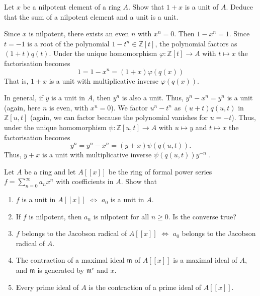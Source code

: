 \documentclass[12 pt, letterpaper]{hmcpset}
\begin{document}
\begin{problem}[A \& M Ch. 1 \#1.]
	Let $x$ be a nilpotent element of a ring $A$. Show that $1 + x$ is a unit of $A$. Deduce that the sum of a nilpotent element and a unit is a unit.
\end{problem}

\begin{solution}
	Since $x$ is nilpotent, there exists an even $n$ with $x^{n} = 0$. Then $1 - x^{n} = 1$. Since $t = - 1$ is a root of the polynomial $1 - t^{n} \in \mathbb{Z}[t]$, the polynomial factors as $(1 + t)q(t)$. Under the unique homomorphism $\varphi : \mathbb{Z}[t] \to A$ with $t \mapsto x$ the factorisation becomes
	\[
		1 = 1 - x^{n} = (1 + x)\varphi(q(x))
	\]
	That is, $1 + x$ is a unit with multiplicative inverse $\varphi(q(x))$.

	In general, if $y$ is a unit in $A$, then $y^{n}$ is also a unit. Thus, $y^{n} - x^{n} = y^{n}$ is a unit (again, here $n$ is even, with $x^{n} = 0$). We factor $u^{n} - t^{n}$ as $(u + t) q(u, t)$ in $\mathbb{Z}[u, t]$ (again, we can factor because the polynomial vanishes for $u = - t$). Thus, under the unique homomorphism $\psi : \mathbb{Z}[u, t] \to A$ with $u \mapsto y$ and $t \mapsto x$ the factorisation becomes
	\[
		y^{n} = y^{n} - x^{n} = (y + x) \psi(q(u, t)).
	\]
	Thus, $y + x$ is a unit with multiplicative inverse $\psi(q(u, t)) y^{-n}$ .
\end{solution}

\pagebreak

\begin{problem}[A \& M Ch. 1 \#5.]
	Let $A$ be a ring and let $A[[x]]$ be the ring of formal power series $f = \sum_{n = 0}^{\infty} a_{n} x^{n}$ with coefficients in $A$. Show that
	\begin{enumerate}[label = (\roman*)]
		\item $f$ is a unit in $A[[x]]$ $\iff$ $a_{0}$ is a unit in $A$.

		\item If $f$ is nilpotent, then $a_{n}$ is nilpotent for all $n \ge 0$. Is the converse true?

		\item $f$ belongs to the Jacobson radical of $A[[x]]$ $\iff$ $a_{0}$ belongs to the Jacobson radical of $A$.

		\item The contraction of a maximal ideal $\mathfrak{m}$ of $A[[x]]$ is a maximal ideal of $A$, and $\mathfrak{m}$ is generated by $\mathfrak{m}^{\text{c}}$ and $x$.

		\item Every prime ideal of $A$ is the contraction of a prime ideal of $A[[x]]$.
	\end{enumerate}
\end{problem}
\end{document}
